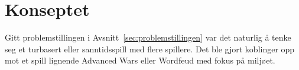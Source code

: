 \section{Konseptet}
Gitt problemstillingen i Avsnitt~\ref{sec:problemstillingen} var det naturlig å tenke seg et turbasert eller
sanntidsspill med flere spillere. Det ble gjort koblinger opp mot et
spill lignende Advanced Wars\cite{advancewars} eller
Wordfeud\cite{wordfeud} med fokus på miljøet.
